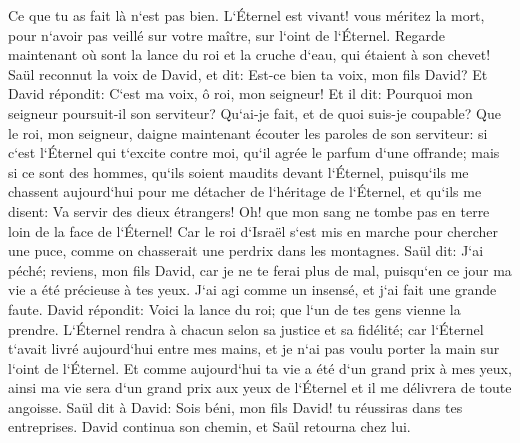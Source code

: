 \verse Ce que tu as fait là n`est pas bien. L`Éternel est vivant! vous méritez la mort, pour n`avoir pas veillé sur votre maître, sur l`oint de l`Éternel. Regarde maintenant où sont la lance du roi et la cruche d`eau, qui étaient à son chevet! 
\verse Saül reconnut la voix de David, et dit: Est-ce bien ta voix, mon fils David? Et David répondit: C`est ma voix, ô roi, mon seigneur! 
\verse Et il dit: Pourquoi mon seigneur poursuit-il son serviteur? Qu`ai-je fait, et de quoi suis-je coupable? 
\verse Que le roi, mon seigneur, daigne maintenant écouter les paroles de son serviteur: si c`est l`Éternel qui t`excite contre moi, qu`il agrée le parfum d`une offrande; mais si ce sont des hommes, qu`ils soient maudits devant l`Éternel, puisqu`ils me chassent aujourd`hui pour me détacher de l`héritage de l`Éternel, et qu`ils me disent: Va servir des dieux étrangers! 
\verse Oh! que mon sang ne tombe pas en terre loin de la face de l`Éternel! Car le roi d`Israël s`est mis en marche pour chercher une puce, comme on chasserait une perdrix dans les montagnes. 
\verse Saül dit: J`ai péché; reviens, mon fils David, car je ne te ferai plus de mal, puisqu`en ce jour ma vie a été précieuse à tes yeux. J`ai agi comme un insensé, et j`ai fait une grande faute. 
\verse David répondit: Voici la lance du roi; que l`un de tes gens vienne la prendre. 
\verse L`Éternel rendra à chacun selon sa justice et sa fidélité; car l`Éternel t`avait livré aujourd`hui entre mes mains, et je n`ai pas voulu porter la main sur l`oint de l`Éternel. 
\verse Et comme aujourd`hui ta vie a été d`un grand prix à mes yeux, ainsi ma vie sera d`un grand prix aux yeux de l`Éternel et il me délivrera de toute angoisse. 
\verse Saül dit à David: Sois béni, mon fils David! tu réussiras dans tes entreprises. David continua son chemin, et Saül retourna chez lui. 

\chapter{}

